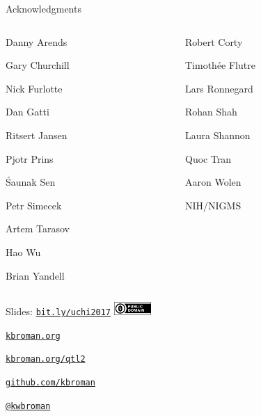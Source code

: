 \documentclass[12pt,t]{beamer}
\begin{document}
\begin{frame}[c]{Acknowledgments}

\begin{columns}[T]
  \begin{column}[T]{0.5\textwidth}
    \vspace{0pt}
\bi
\item[] Danny Arends
\item[] Gary Churchill
\item[] Nick Furlotte
\item[] Dan Gatti
\item[] Ritsert Jansen
\item[] Pjotr Prins
\item[] \'Saunak Sen
\item[] Petr Simecek
\item[] Artem Tarasov
\item[] Hao Wu
\item[] Brian Yandell
  \ei
  \end{column} \hfill
\begin{column}[T]{0.5\textwidth}
\vspace*{0mm}

  \bi
\item[] Robert Corty
\item[] Timoth\'ee Flutre
\item[] Lars Ronnegard
\item[] Rohan Shah
\item[] Laura Shannon
\item[] Quoc Tran
\item[] Aaron Wolen
\item[]
\item[] NIH/NIGMS
  \ei
\end{column}
\end{columns}

\end{frame}


\begin{frame}[c]{}

\Large

Slides: \href{http://bit.ly/uchi2017}{\tt bit.ly/uchi2017} \quad
\includegraphics[height=5mm]{Figs/cc-zero.png}

\vspace{7mm}

\href{http://kbroman.org}{\tt \lolit kbroman.org}

\vspace{7mm}

\href{http://kbroman.org/qtl2}{\tt kbroman.org/qtl2}

\vspace{7mm}

\href{https://github.com/kbroman}{\tt \lolit github.com/kbroman}

\vspace{7mm}

\href{https://twitter.com/kwbroman}{\tt \lolit @kwbroman}


\end{frame}
\end{document}
